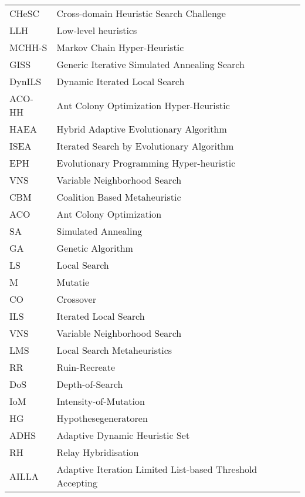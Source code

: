 \begin{flushleft}
  \renewcommand{\arraystretch}{1.1}
  \begin{tabularx}{\textwidth}{@{}p{18mm}X@{}}%
    CHeSC	& Cross-domain Heuristic Search Challenge \\
    LLH		&Low-level heuristics \\
    MCHH-S	&Markov Chain Hyper-Heuristic\\
    GISS	&Generic Iterative Simulated Annealing Search\\
    DynILS	&Dynamic Iterated Local Search\\
    ACO-HH	&Ant Colony Optimization Hyper-Heuristic\\
    HAEA	&Hybrid Adaptive Evolutionary Algorithm\\
    ISEA	&Iterated Search by Evolutionary Algorithm\\
    EPH		&Evolutionary Programming Hyper-heuristic\\
    VNS		&Variable Neighborhood Search\\
    CBM		&Coalition Based Metaheuristic\\
    ACO		&Ant Colony Optimization\\
    SA		&Simulated Annealing\\
    GA		&Genetic Algorithm\\
    LS		&Local Search\\
    M		&Mutatie\\
    CO		&Crossover\\
    ILS		&Iterated Local Search\\
    VNS		&Variable Neighborhood Search\\
    LMS		&Local Search Metaheuristics\\
    RR		&Ruin-Recreate\\
    DoS		&Depth-of-Search\\
    IoM		&Intensity-of-Mutation\\
    HG		&Hypothesegeneratoren\\
    ADHS	&Adaptive Dynamic Heuristic Set\\
    RH		&Relay Hybridisation\\
    AILLA	&Adaptive Iteration Limited List-based Threshold Accepting\\
  \end{tabularx}
\end{flushleft}